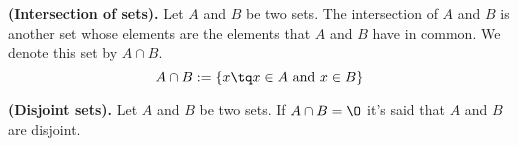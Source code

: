 
\begin{definition}
    \textbf{(Intersection of sets).} Let $A$ and $B$ be two sets. The intersection of $A$ and $B$ is another set whose elements are the elements that $A$ and $B$ have in common. We denote this set by $A\cap B$.
    \begin{equation}
        A\cap B := \{x\tq x\in A\textrm{ and } x\in B\}
    \end{equation}
\end{definition}


\begin{definition}
    \textbf{(Disjoint sets).} Let $A$ and $B$ be two sets. If $A\cap B = \O$ it's said that $A$ and $B$ are disjoint.
\end{definition}

